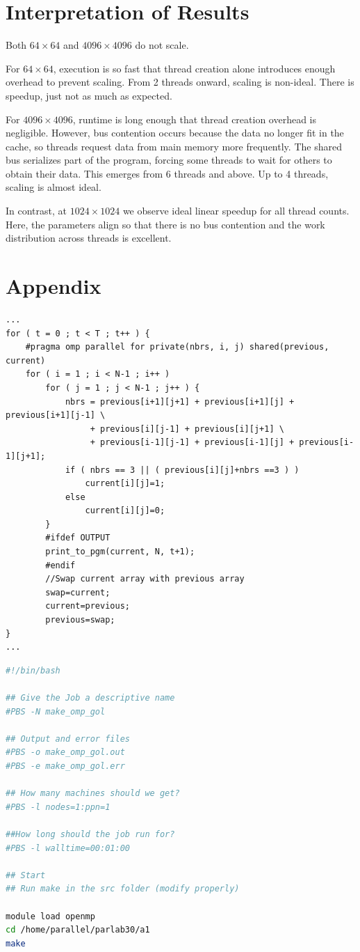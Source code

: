 \documentclass{article}
\newcommand{\eng}[1]{#1}
\begin{document}
\section{Interpretation of Results}

Both $64 \times 64$ and $4096 \times 4096$ do not scale.

For $64 \times 64$, execution is so fast that thread creation alone introduces enough overhead to prevent scaling. From 2 threads onward, scaling is non-ideal. There is speedup, just not as much as expected.

For $4096 \times 4096$, runtime is long enough that thread creation overhead is negligible. However, bus contention occurs because the data no longer fit in the \eng{cache}, so threads request data from main memory more frequently. The shared bus serializes part of the program, forcing some threads to wait for others to obtain their data. This emerges from 6 threads and above. Up to 4 threads, scaling is almost ideal.

In contrast, at $1024 \times 1024$ we observe ideal linear \eng{speedup} for all thread counts. Here, the parameters align so that there is no bus contention and the work distribution across threads is excellent.

\clearpage
\section{Appendix}

\begin{lstlisting}[caption={Parallelized Game Of Life}, style=CStyle, label={lst:parallelized-gol}]
...
for ( t = 0 ; t < T ; t++ ) {
    #pragma omp parallel for private(nbrs, i, j) shared(previous, current)
    for ( i = 1 ; i < N-1 ; i++ )
        for ( j = 1 ; j < N-1 ; j++ ) {
            nbrs = previous[i+1][j+1] + previous[i+1][j] + previous[i+1][j-1] \
                 + previous[i][j-1] + previous[i][j+1] \
                 + previous[i-1][j-1] + previous[i-1][j] + previous[i-1][j+1];
            if ( nbrs == 3 || ( previous[i][j]+nbrs ==3 ) )
                current[i][j]=1;
            else
                current[i][j]=0;
        }
        #ifdef OUTPUT
        print_to_pgm(current, N, t+1);
        #endif
        //Swap current array with previous array
        swap=current;
        current=previous;
        previous=swap;
}
... 
\end{lstlisting}

\begin{lstlisting}[caption={Bash Script to build Game Of Life}, language=bash, label={lst:make-gol}]
#!/bin/bash

## Give the Job a descriptive name
#PBS -N make_omp_gol

## Output and error files
#PBS -o make_omp_gol.out
#PBS -e make_omp_gol.err

## How many machines should we get? 
#PBS -l nodes=1:ppn=1

##How long should the job run for?
#PBS -l walltime=00:01:00

## Start 
## Run make in the src folder (modify properly)

module load openmp
cd /home/parallel/parlab30/a1
make
\end{lstlisting}
\end{document}
